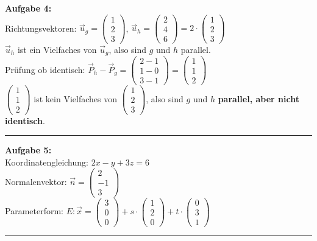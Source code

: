 \documentclass[12pt,a4paper]{article}
\newcommand{\vek}[1]{\vec{#1}}
\begin{document}
\textbf{Aufgabe 4:} \\
Richtungsvektoren: $\vek{u}_g = \begin{pmatrix}1\\2\\3\end{pmatrix}$, $\vek{u}_h = \begin{pmatrix}2\\4\\6\end{pmatrix} = 2 \cdot \begin{pmatrix}1\\2\\3\end{pmatrix}$ \\
$\vek{u}_h$ ist ein Vielfaches von $\vek{u}_g$, also sind $g$ und $h$ parallel. \\
Prüfung ob identisch: $\vek{P}_h - \vek{P}_g = \begin{pmatrix}2-1\\1-0\\3-1\end{pmatrix} = \begin{pmatrix}1\\1\\2\end{pmatrix}$ \\
$\begin{pmatrix}1\\1\\2\end{pmatrix}$ ist kein Vielfaches von $\begin{pmatrix}1\\2\\3\end{pmatrix}$, also sind $g$ und $h$ \textbf{parallel, aber nicht identisch}.
\begin{center}\rule{0.8\linewidth}{0.4pt}\end{center}

\textbf{Aufgabe 5:} \\
Koordinatengleichung: $2x - y + 3z = 6$ \\
Normalenvektor: $\vek{n} = \begin{pmatrix}2\\-1\\3\end{pmatrix}$ \\
Parameterform: $E: \vek{x} = \begin{pmatrix}3\\0\\0\end{pmatrix} + s \cdot \begin{pmatrix}1\\2\\0\end{pmatrix} + t \cdot \begin{pmatrix}0\\3\\1\end{pmatrix}$
\begin{center}\rule{0.8\linewidth}{0.4pt}\end{center}
\end{document}
